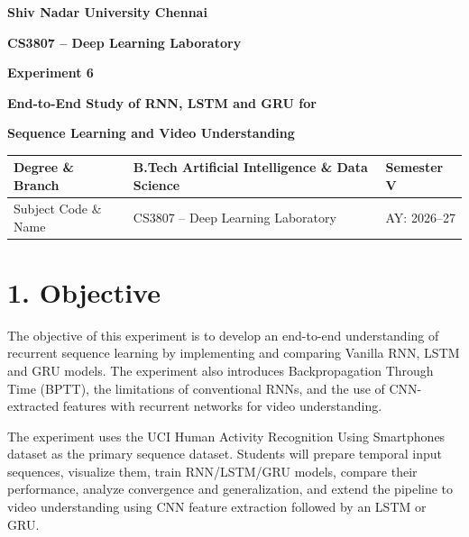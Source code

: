 \documentclass[10pt]{article}
\begin{document}

\begin{center}

{\large\textbf{Shiv Nadar University Chennai}}

\vspace{2mm}

{\normalsize\textbf{CS3807 -- Deep Learning Laboratory}}

\vspace{2mm}

{\large\textbf{Experiment 6}}

\vspace{1mm}

{\normalsize\textbf{End-to-End Study of RNN, LSTM and GRU for}}

{\normalsize\textbf{Sequence Learning and Video Understanding}}

\end{center}

\vspace{3mm}

\begin{tabular}{|p{3.4cm}|p{9.0cm}|p{1.4cm}|}
\hline
Degree \& Branch &
B.Tech Artificial Intelligence \& Data Science &
Semester V\\
\hline
Subject Code \& Name &
CS3807 -- Deep Learning Laboratory &
AY: 2026--27\\
\hline
\end{tabular}

\section*{1. Objective}

The objective of this experiment is to develop an end-to-end understanding of
recurrent sequence learning by implementing and comparing Vanilla RNN, LSTM
and GRU models. The experiment also introduces Backpropagation Through Time
(BPTT), the limitations of conventional RNNs, and the use of CNN-extracted
features with recurrent networks for video understanding.

The experiment uses the UCI Human Activity Recognition Using Smartphones
dataset as the primary sequence dataset. Students will prepare temporal input
sequences, visualize them, train RNN/LSTM/GRU models, compare their
performance, analyze convergence and generalization, and extend the pipeline
to video understanding using CNN feature extraction followed by an LSTM or
GRU.
\end{document}
